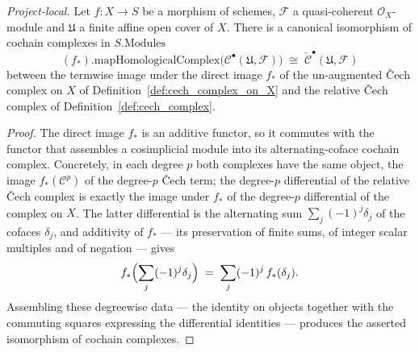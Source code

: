 \begin{lemma}
  \label{lem:pushforward_mapHC_cechComplexOnX}
  \textit{Project-local.}
  Let \(f : X \to S\) be a morphism of schemes, \(\mathcal{F}\) a quasi-coherent
  \(\mathcal{O}_X\)-module and \(\mathfrak{U}\) a finite affine open cover of \(X\).
  There is a canonical isomorphism of cochain complexes in \(S.\mathrm{Modules}\)
  \[
    (f_*).\mathrm{mapHomologicalComplex}\bigl(\mathcal{C}^\bullet(\mathfrak{U},
      \mathcal{F})\bigr)
      \;\cong\;
    \check{\mathcal{C}}^\bullet(\mathfrak{U}, \mathcal{F})
  \]
  between the termwise image under the direct image \(f_*\) of the un-augmented
  {\v C}ech complex on \(X\) of Definition~\ref{def:cech_complex_on_X} and the
  relative {\v C}ech complex of Definition~\ref{def:cech_complex}.
\end{lemma}
\begin{proof}
  The direct image \(f_*\) is an additive functor, so it commutes with the functor
  that assembles a cosimplicial module into its alternating-coface cochain complex.
  Concretely, in each degree \(p\) both complexes have the same object, the image
  \(f_*(\mathcal{C}^p)\) of the degree-\(p\) {\v C}ech term; the degree-\(p\)
  differential of the relative {\v C}ech complex is exactly the image under \(f_*\) of
  the degree-\(p\) differential of the complex on \(X\). The latter differential is
  the alternating sum \(\sum_{j} (-1)^j \delta_j\) of the cofaces \(\delta_j\), and
  additivity of \(f_*\) --- its preservation of finite sums, of integer scalar
  multiples and of negation --- gives
  \[
    f_*\Bigl(\sum_j (-1)^j \delta_j\Bigr)
      \;=\;
    \sum_j (-1)^j\, f_*(\delta_j).
  \]
  Assembling these degreewise data --- the identity on objects together with the
  commuting squares expressing the differential identities --- produces the asserted
  isomorphism of cochain complexes.
\end{proof}

